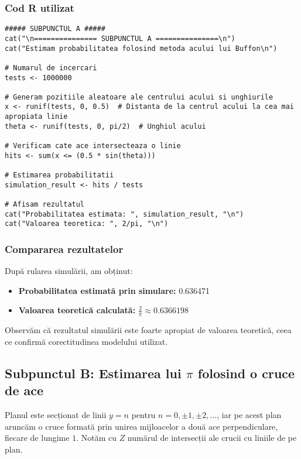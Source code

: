 \documentclass{article}
\begin{document}
\subsubsection*{Cod R utilizat}
\begin{lstlisting}
##### SUBPUNCTUL A #####
cat("\n=============== SUBPUNCTUL A ===============\n")
cat("Estimam probabilitatea folosind metoda acului lui Buffon\n")

# Numarul de incercari
tests <- 1000000

# Generam pozitiile aleatoare ale centrului acului si unghiurile
x <- runif(tests, 0, 0.5)  # Distanta de la centrul acului la cea mai apropiata linie
theta <- runif(tests, 0, pi/2)  # Unghiul acului

# Verificam cate ace intersecteaza o linie
hits <- sum(x <= (0.5 * sin(theta)))

# Estimarea probabilitatii
simulation_result <- hits / tests

# Afisam rezultatul
cat("Probabilitatea estimata: ", simulation_result, "\n")
cat("Valoarea teoretica: ", 2/pi, "\n")
\end{lstlisting}

\subsubsection*{Compararea rezultatelor}

După rularea simulării, am obținut:

\begin{itemize}
    \item \textbf{Probabilitatea estimată prin simulare:} 0.636471
    \item \textbf{Valoarea teoretică calculată:} \( \frac{2}{\pi} \approx 0.6366198 \)
\end{itemize}

Observăm că rezultatul simulării este foarte apropiat de valoarea teoretică, ceea ce confirmă corectitudinea modelului utilizat.

\subsection{Subpunctul B: Estimarea lui \(\pi\) folosind o cruce de ace}

Planul este secționat de linii \( y = n \) pentru \( n = 0, \pm 1, \pm 2, \dots \), iar pe acest plan aruncăm o cruce formată prin unirea mijloacelor a două ace perpendiculare, fiecare de lungime \(1\). Notăm cu \( Z \) numărul de intersecții ale crucii cu liniile de pe plan.
\end{document}
